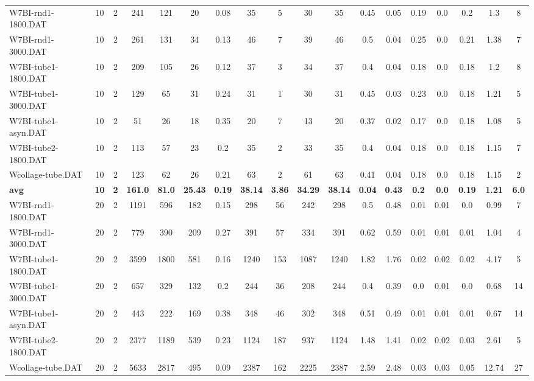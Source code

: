 \begin{sidewaystable}[h]
{\begin{tabular}{lccccccccccccccccc}
W7BI-rnd1-1800.DAT & 10 & 2 & 241 & 121 & 20 & 0.08 & 35 & 5 & 30 & 35 & 0.45 & 0.05 & 0.19 & 0.0 & 0.2 & 1.3 & 8\\
W7BI-rnd1-3000.DAT & 10 & 2 & 261 & 131 & 34 & 0.13 & 46 & 7 & 39 & 46 & 0.5 & 0.04 & 0.25 & 0.0 & 0.21 & 1.38 & 7\\
W7BI-tube1-1800.DAT & 10 & 2 & 209 & 105 & 26 & 0.12 & 37 & 3 & 34 & 37 & 0.4 & 0.04 & 0.18 & 0.0 & 0.18 & 1.2 & 8\\
W7BI-tube1-3000.DAT & 10 & 2 & 129 & 65 & 31 & 0.24 & 31 & 1 & 30 & 31 & 0.45 & 0.03 & 0.23 & 0.0 & 0.18 & 1.21 & 5\\
W7BI-tube1-asyn.DAT & 10 & 2 & 51 & 26 & 18 & 0.35 & 20 & 7 & 13 & 20 & 0.37 & 0.02 & 0.17 & 0.0 & 0.18 & 1.08 & 5\\
W7BI-tube2-1800.DAT & 10 & 2 & 113 & 57 & 23 & 0.2 & 35 & 2 & 33 & 35 & 0.4 & 0.04 & 0.18 & 0.0 & 0.18 & 1.15 & 7\\
Wcollage-tube.DAT & 10 & 2 & 123 & 62 & 26 & 0.21 & 63 & 2 & 61 & 63 & 0.41 & 0.04 & 0.18 & 0.0 & 0.18 & 1.15 & 2\\
\cline{1-18} \textbf{avg} & \textbf{10} & \textbf{2} & \textbf{161.0} & \textbf{81.0} & \textbf{25.43} & \textbf{0.19} & \textbf{38.14} & \textbf{3.86} & \textbf{34.29} & \textbf{38.14} & \textbf{0.04} & \textbf{0.43} & \textbf{0.2} & \textbf{0.0} & \textbf{0.19} & \textbf{1.21} & \textbf{6.0} \\ \cline{1-18}
W7BI-rnd1-1800.DAT & 20 & 2 & 1191 & 596 & 182 & 0.15 & 298 & 56 & 242 & 298 & 0.5 & 0.48 & 0.01 & 0.01 & 0.0 & 0.99 & 7\\
W7BI-rnd1-3000.DAT & 20 & 2 & 779 & 390 & 209 & 0.27 & 391 & 57 & 334 & 391 & 0.62 & 0.59 & 0.01 & 0.01 & 0.01 & 1.04 & 4\\
W7BI-tube1-1800.DAT & 20 & 2 & 3599 & 1800 & 581 & 0.16 & 1240 & 153 & 1087 & 1240 & 1.82 & 1.76 & 0.02 & 0.02 & 0.02 & 4.17 & 5\\
W7BI-tube1-3000.DAT & 20 & 2 & 657 & 329 & 132 & 0.2 & 244 & 36 & 208 & 244 & 0.4 & 0.39 & 0.0 & 0.01 & 0.0 & 0.68 & 14\\
W7BI-tube1-asyn.DAT & 20 & 2 & 443 & 222 & 169 & 0.38 & 348 & 46 & 302 & 348 & 0.51 & 0.49 & 0.01 & 0.01 & 0.01 & 0.67 & 14\\
W7BI-tube2-1800.DAT & 20 & 2 & 2377 & 1189 & 539 & 0.23 & 1124 & 187 & 937 & 1124 & 1.48 & 1.41 & 0.02 & 0.02 & 0.03 & 2.61 & 5\\
Wcollage-tube.DAT & 20 & 2 & 5633 & 2817 & 495 & 0.09 & 2387 & 162 & 2225 & 2387 & 2.59 & 2.48 & 0.03 & 0.03 & 0.05 & 12.74 & 27\\

\end{tabular}}
\end{sidewaystable}
